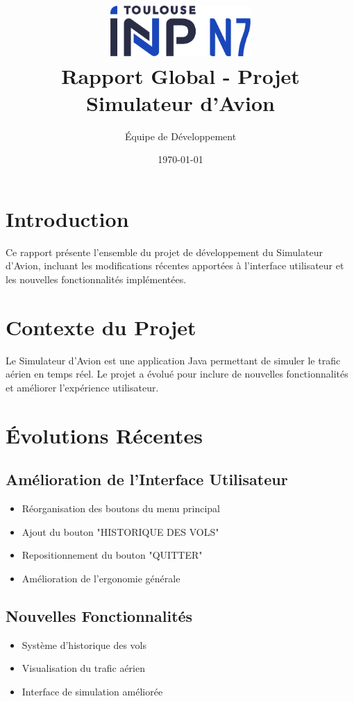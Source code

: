 \documentclass[12pt,a4paper]{article}
\title{
    \includegraphics[width=0.4\textwidth]{n7.png}\\[1cm]
    \textbf{Rapport Global - Projet Simulateur d'Avion}
}
\author{Équipe de Développement}
\date{\today}
\begin{document}
\maketitle
\thispagestyle{empty}

\tableofcontents
\newpage

\section{Introduction}
Ce rapport présente l'ensemble du projet de développement du Simulateur d'Avion, incluant les modifications récentes apportées à l'interface utilisateur et les nouvelles fonctionnalités implémentées.

\section{Contexte du Projet}
Le Simulateur d'Avion est une application Java permettant de simuler le trafic aérien en temps réel. Le projet a évolué pour inclure de nouvelles fonctionnalités et améliorer l'expérience utilisateur.

\section{Évolutions Récentes}
\subsection{Amélioration de l'Interface Utilisateur}
\begin{itemize}
    \item Réorganisation des boutons du menu principal
    \item Ajout du bouton "HISTORIQUE DES VOLS"
    \item Repositionnement du bouton "QUITTER"
    \item Amélioration de l'ergonomie générale
\end{itemize}

\subsection{Nouvelles Fonctionnalités}
\begin{itemize}
    \item Système d'historique des vols
    \item Visualisation du trafic aérien
    \item Interface de simulation améliorée
\end{itemize}
\end{document}
